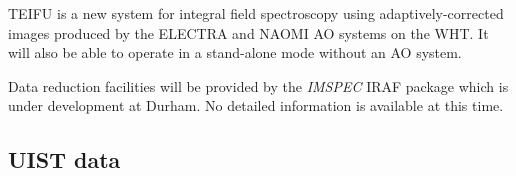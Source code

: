 \documentclass[twoside,11pt]{article}
\newcommand{\htmladdnormallink}[2]{#1}
\newcommand{\xref}[3]{#1}
\newcommand{\xlabel}[1]{}
\begin{document}
\htmladdnormallink{TEIFU}{http://star-www.dur.ac.uk/~jra/teifu.html} is a new system for integral field spectroscopy using adaptively-corrected images produced by the \htmladdnormallink{ELECTRA}{http://aig-www.dur.ac.uk/electra/} and \htmladdnormallink{NAOMI}{http://www.ing.iac.es/~crb/wht/ao.html} AO systems on the WHT. It will also be able to operate in a stand-alone mode without an AO system. 

Data reduction facilities will be provided by the {\em IMSPEC} IRAF package which is under development at Durham. No detailed information is available at this time.

\subsection{\xlabel{sc16_uist}UIST data\label{sc16_uist}}



\end{document}
